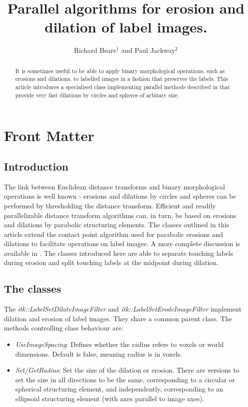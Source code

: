 \documentclass{InsightArticle}
\title{Parallel algorithms for erosion and dilation of label images.}
\author{Richard Beare{$^1$} {\small and} Paul Jackway{$^2$}}
\newcommand{\IJhandlerIDnumber}{999}
\begin{document}
\IJhandlefooter{\IJhandlerIDnumber}

\maketitle

\ifhtml
\chapter*{Front Matter\label{front}}
\fi


\begin{abstract}
\noindent
It is sometimes useful to be able to apply binary morphological
operations, such as erosions and dilations, to labelled images in a
fashion that preserves the labels. This article introduces a
specialised class implementing parallel methods described in
\cite{beare2011parallel} that provide very fast dilations by circles
and spheres of arbitary size.
\end{abstract}

\tableofcontents

\section{Introduction}
The link between Euclidean distance transforms and binary
morphological operations is well known - erosions and dilations by
circles and spheres can be performed by thresholding the distance
transform. Efficient and readily parallelizable distance transform
algorithms can, in turn, be based on erosions and dilations by
parabolic structuring elements. The classes outlined in this article
extend the contact point algorithm used for parabolic erosions and
dilations to facilitate operations on label images. A more complete
discussion is available in \cite{beare2011parallel}. The classes
introduced here are able to separate touching labels during erosion
and split touching labels at the midpoint during dilation.

\section{The classes}
The {\em itk::LabelSetDilateImageFilter} and {\em
  itk::LabelSetErodeImageFilter} implement dilation and erosion of
label images. They share a common parent class. The methods controlling class behaviour are:
\begin{itemize}
\item {\em UseImageSpacing}: Defines whether the radius refers to voxels or world dimensions. Default is false, meaning radius is in voxels.
\item {\em Set/GetRadius}: Set the size of the dilation or erosion. There are versions to set the size in all directions to be the same, corresponding to a circular or spherical structuring element, and independently, corresponding to an ellipsoid structuring element (with axes parallel to image axes).
\end{itemize}
\end{document}
